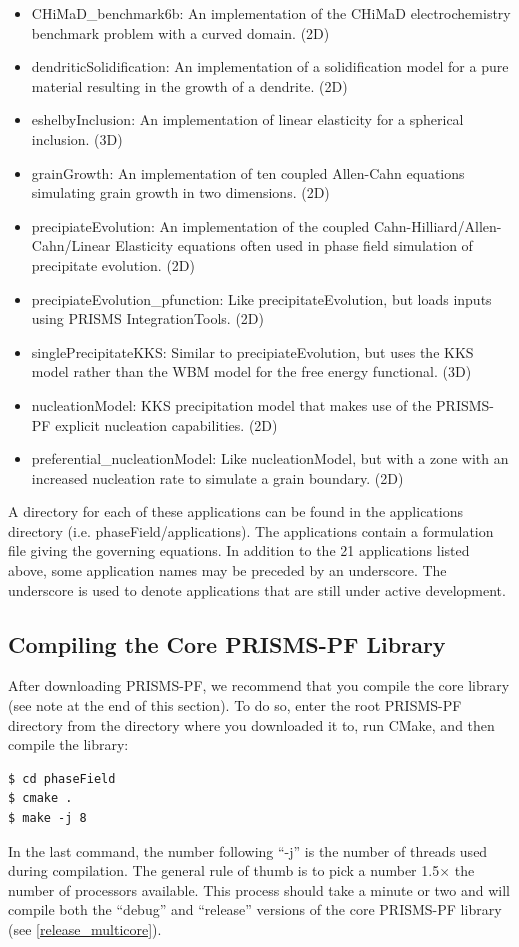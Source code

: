 \documentclass[10pt]{article} %
\begin{document}
\begin{itemize}
\item CHiMaD\_benchmark6b: An implementation of the CHiMaD electrochemistry benchmark problem with a curved domain. (2D)
\item dendriticSolidification: An implementation of a solidification model for a pure material resulting in the growth of a dendrite. (2D)
\item eshelbyInclusion: An implementation of linear elasticity for a spherical inclusion. (3D)
\item grainGrowth: An implementation of ten coupled Allen-Cahn equations simulating grain growth in two dimensions. (2D)
\item precipiateEvolution: An implementation of the coupled Cahn-Hilliard/Allen-Cahn/Linear Elasticity equations often used in phase field simulation of precipitate evolution. (2D)
\item precipiateEvolution\_pfunction: Like precipitateEvolution, but loads inputs using PRISMS IntegrationTools. (2D)
\item singlePrecipitateKKS: Similar to precipiateEvolution, but uses the KKS model rather than the WBM model for the free energy functional. (3D)
\item nucleationModel: KKS precipitation model that makes use of the PRISMS-PF explicit nucleation capabilities. (2D)
\item preferential\_nucleationModel: Like nucleationModel, but with a zone with an increased nucleation rate to simulate a grain boundary. (2D)
\end{itemize}

A directory for each of these applications can be found in the applications directory (i.e. phaseField/applications). The applications contain a formulation file giving the governing equations. In addition to the 21 applications listed above, some application names may be preceded by an underscore. The underscore is used to denote applications that are still under active development.

\subsection{Compiling the Core PRISMS-PF Library}
After downloading PRISMS-PF, we recommend that you compile the core library (see note at the end of this section). To do so, enter the root PRISMS-PF directory from the directory where you downloaded it to, run CMake, and then compile the library:
\begin{lstlisting}
$ cd phaseField 
$ cmake .
$ make -j 8 
\end{lstlisting}
In the last command, the number following ``-j'' is the number of threads used during compilation. The general rule of thumb is to pick a number 1.5$\times$ the number of processors available. This process should take a minute or two and will compile both the ``debug'' and ``release'' versions of the core PRISMS-PF library (see \ref{release_multicore}).
\end{document}
